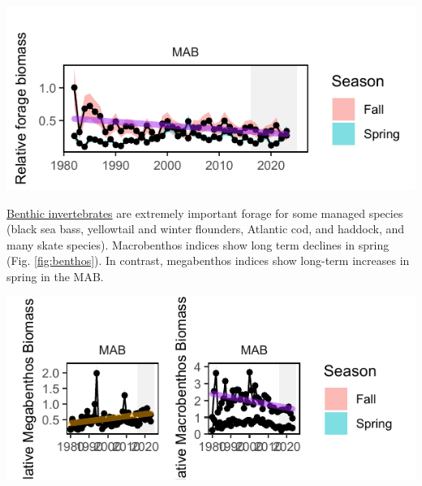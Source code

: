 \documentclass[
  10pt,
]{article}
\let\origfigure\figure
\let\endorigfigure\endfigure
\renewenvironment{figure}[1][2] {
    \expandafter\origfigure\expandafter[H]
} {
    \endorigfigure
}
\begin{document}
\begin{figure}

{\centering \includegraphics{midatlantic_files/figure-latex/foragebio-1} 

}

\caption{Forage fish index in the MAB for spring (blue) and fall (red) surveys, with a decline (purple) in fall. Index values are relative to the maximum observation within a region across surveys.}\label{fig:foragebio}
\end{figure}

\href{https://noaa-edab.github.io/catalog/benthos_index.html}{Benthic invertebrates} are extremely important forage for some managed species (black sea bass, yellowtail and winter flounders, Atlantic cod, and haddock, and many skate species). Macrobenthos indices show long term declines in spring (Fig. \ref{fig:benthos}). In contrast, megabenthos indices show long-term increases in spring in the MAB.

\begin{figure}

{\centering \includegraphics{midatlantic_files/figure-latex/benthos-1} 

}

\caption{Changes in spring (blue) and fall (red) benthos abundance in the MAB for megabenthos (left) and macrobenthos (right).}\label{fig:benthos}
\end{figure}
\end{document}
